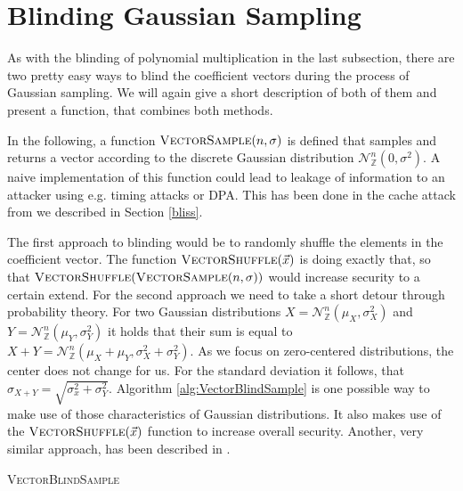 \section{Blinding Gaussian Sampling}
As with the blinding of polynomial multiplication in the last subsection, there are two pretty easy ways to blind the coefficient vectors during the process of Gaussian sampling. We will again give a short description of both of them and present a function, that combines both methods.

In the following, a function \(\textsc{VectorSample}(n,\sigma)\) is defined that samples and returns a vector according to the discrete Gaussian distribution \(\mathcal{N}_\mathbb{Z}^{n} (0, \sigma^2)\). A naive implementation of this function could lead to leakage of information to an attacker using e.g. timing attacks or \ac{DPA}. This has been done in the cache attack from \cite{cryptoeprint:2016:300} we described in Section \ref{bliss}.

The first approach to blinding would be to randomly shuffle the elements in the coefficient vector. The function \(\textsc{VectorShuffle}(\vec{x})\) is doing exactly that, so that \(\textsc{VectorShuffle}(\textsc{VectorSample}(n,\sigma))\) would increase security to a certain extend. For the second approach we need to take a short detour through probability theory. For two Gaussian distributions \(X=\mathcal{N}_\mathbb{Z}^{n} (\mu_X, \sigma^2_X)\) and \(Y=\mathcal{N}_\mathbb{Z}^{n} (\mu_Y, \sigma^2_Y)\) it holds that their sum is equal to \(X+Y=\mathcal{N}_\mathbb{Z}^{n} (\mu_X+\mu_Y, \sigma^2_X+\sigma^2_Y)\). As we focus on zero-centered distributions, the center does not change for us. For the standard deviation it follows, that \(\sigma_{X+Y}=\sqrt{\sigma^2_x+\sigma^2_Y}\). Algorithm \ref{alg:VectorBlindSample} is one possible way to make use of those characteristics of Gaussian distributions. It also makes use of the \(\textsc{VectorShuffle}(\vec{x})\) function to increase overall security. Another, very similar approach, has been described in \cite{cryptoeprint:2014:254}.


\begin{algorithm}
    \caption{\textsc{VectorBlindSample}}
    \label{alg:VectorBlindSample}
    \begin{algorithmic}[1]
        \EndFor\\
    \end{algorithmic}
\end{algorithm}